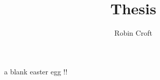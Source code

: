 \documentclass[11pt]{report}  %
\title{Thesis}
\author{Robin Croft}
\numberwithin{equation}{section}
\begin{document}


\newpage 

\color{white} 
a blank easter egg !!
\color{black}

\newpage













\end{document}
